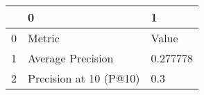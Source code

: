 \begin{tabular}{lll}
\toprule
{} &                       0 &         1 \\
\midrule
0 &                  Metric &     Value \\
1 &       Average Precision &  0.277778 \\
2 &  Precision at 10 (P@10) &       0.3 \\
\bottomrule
\end{tabular}
